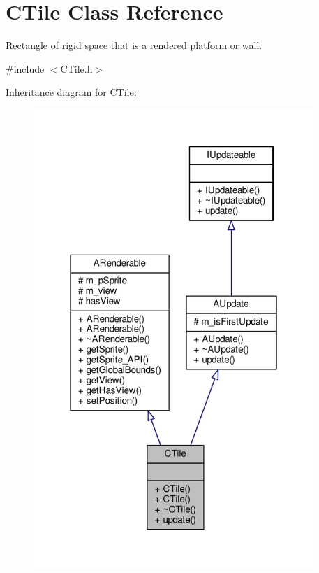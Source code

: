 \hypertarget{classCTile}{\section{C\-Tile Class Reference}
\label{classCTile}
}


Rectangle of rigid space that is a rendered platform or wall.  




{\ttfamily \#include $<$C\-Tile.\-h$>$}



Inheritance diagram for C\-Tile\-:\nopagebreak
\begin{figure}[H]
\begin{center}
\leavevmode
\includegraphics[width=301pt]{classCTile__inherit__graph}
\end{center}
\end{figure}


